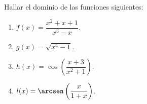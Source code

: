 
{Hallar el dominio de las funciones siguientes:
\begin{multicols}{2}
\begin{enumerate}
  \item $f(x)=\dfrac{x^2+x+1}{x^3-x}$.

  \item $g(x)=\sqrt{x^4-1}$.

  \item $h(x)=\cos\left(\dfrac{x+3}{x^2+1}\right)$.

   \item $l(x)=\arcsen\left(\dfrac{x}{1+x}\right)$.
\end{enumerate}
\end{multicols}
}
